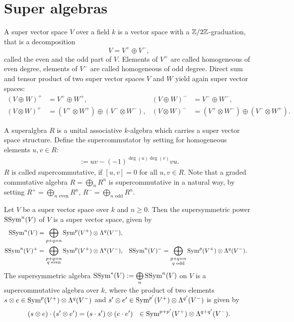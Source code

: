 \section{Super algebras}
\begin{definition}
 A super vector space $V$ over a field $k$ is a vector space with a $\mathbb{Z}/2\mathbb{Z}$-graduation, that is a decomposition
$$
 V = V^{+} \oplus V^{-},
$$
called the even and the odd part of $V$. Elements of $V^{+}$ are called homogeneous of even degree, elements of $V^{-}$ are called homogeneous of odd degree.
Direct sum and tensor product of two super vector spaces $V$ and $W$ yield again super vector spaces:
\begin{align*}
 (V\oplus W)^{+} &= V^{+}\oplus W^{+}, & (V\oplus W)^{-} &= V^{-}\oplus W^{-}, \\
 (V\otimes W)^{+} &= (V^{+}\otimes W^{+})\oplus (V^{-}\otimes W^{-}), & (V\otimes W)^{-} &=(V^{+}\otimes W^{-})\oplus (V^{-}\otimes W^{+}).
\end{align*}
\end{definition}
\begin{definition}
A superalgbra $R$ is a unital associative $k$-algebra which carries a super vector space structure. Define the supercommutator by setting for homogeneous elements $u,v \in R$:
\begin{align*}
[u,v] := uv - (-1)^{\deg(u)\deg(v)} v u.
\end{align*}
$R$ is called supercommutative, if $[u,v]=0$ for all $u,v\in R$. Note that a graded commutative algebra $R = \bigoplus\limits_n R^n$ is supercommutative in a natural way, by setting $R^{+}=\bigoplus\limits_{n\text{ even}} R^n$, $R^{-}=\bigoplus\limits_{n\text{ odd}} R^n$.
\end{definition}
\begin{definition}
Let $V$ be a super vector space over $k$ and $n\geq 0$. Then the supersymmetric power $\operatorname{SSym}^n(V)$ of $V$ is a super vector space, given by
\begin{align*}
\operatorname{SSym}^n(V) &= \bigoplus_{p+q=n} \operatorname{Sym}^p(V^{+}) \otimes \Lambda^q(V^{-}), \\
\operatorname{SSym}^n(V)^{+} &= \bigoplus_{\substack{p+q=n \\ q\text{ even} }} \operatorname{Sym}^p(V^{+}) \otimes \Lambda^q(V^{-}), &
\operatorname{SSym}^n(V)^{-} &= \bigoplus_{\substack{p+q=n \\ q\text{ odd} }} \operatorname{Sym}^p(V^{+}) \otimes \Lambda^q(V^{-}).
\end{align*}
The supersymmetric algebra $\operatorname{SSym}^*(V):= \bigoplus\limits_n \operatorname{SSym}^n(V)$ on $V$ is a supercommutative algebra over $k$, where the product of two elements $s\otimes e \in \operatorname{Sym}^p(V^{+}) \otimes \Lambda^q(V^{-})$ and $s'\otimes e' \in \operatorname{Sym}^{p'}(V^{+}) \otimes \Lambda^{q'}(V^{-})$ is given by 
$$
(s\otimes e)\cdot (s'\otimes e') = (s\cdot s')\otimes (e\cdot e') \ \  \in \operatorname{Sym}^{p+p'}(V^{+}) \otimes \Lambda^{q+q'}(V^{-}).
$$
\end{definition}

